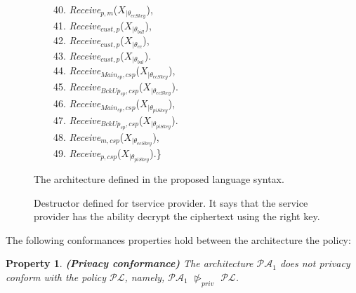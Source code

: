 \documentclass[a4paper]{article}
\newtheorem{ttp}{Property}
\begin{document}
\begin{figure}[htbp]
{\begin{minipage}{15.87 cm}
\begin{tabbing}
\ \ \ \ 40. \textit{Receive}$_{p,m}$($X_{|\theta_{ecSkey}}$),\\
\ \ \ \ 41. \textit{Receive}$_{cust,p}$($X_{|\theta_{bill}}$),\\
\ \ \ \ 42. \textit{Receive}$_{cust,p}$($X_{|\theta_{ec}}$),\\  
\ \ \ \ 43. \textit{Receive}$_{cust,p}$($X_{|\theta_{bal}}$).\\  
\ \ \ \ 44. \textit{Receive}$_{\textit{Main}_{sp},csp}$($X_{|\theta_{ecSkey}}$),\\  
\ \ \ \ 45. \textit{Receive}$_{\textit{BckUp}_{sp},csp}$($X_{|\theta_{ecSkey}}$).\\ 
\ \ \ \ 46. \textit{Receive}$_{\textit{Main}_{sp},csp}$($X_{|\theta_{piSkey}}$),\\  
\ \ \ \ 47. \textit{Receive}$_{\textit{BckUp}_{sp},csp}$($X_{|\theta_{piSkey}}$).\\  
\ \ \ \ 48. \textit{Receive}$_{m,csp}$($X_{|\theta_{ecSkey}}$),\\  
\ \ \ \ 49. \textit{Receive}$_{p,csp}$($X_{|\theta_{piSkey}}$).\}  
\end{tabbing}
\end{minipage}
}
\caption{The architecture defined in the proposed language syntax.}\label{fig:smartarch1}
\end{figure}

\begin{figure}[htbp]
\centering
{}
\caption{Destructor defined for tservice provider. It says that the service provider has the ability decrypt the ciphertext using the right key.}\label{fig:Destructor}
\end{figure}
 
The following conformances properties hold between the architecture the policy: 

\begin{ttp} \textbf{(Privacy conformance)}
\label{propprivconf}
The architecture $\mathcal{P}$$\mathcal{A}_1$ does \textit{not privacy conform} with the policy $\mathcal{P}$$\mathcal{L}$, namely, $\mathcal{P}$$\mathcal{A}_1$ $\ntriangleright_{priv}$ $\mathcal{P}$$\mathcal{L}$.   
\end{ttp}
\end{document}
